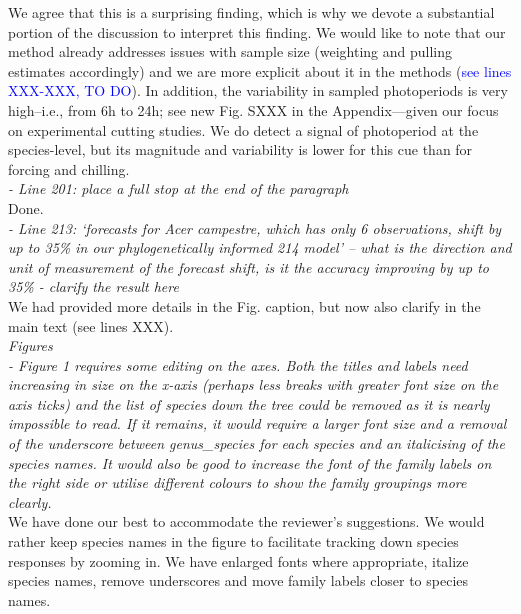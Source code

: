 \documentclass[11pt]{article}
\begin{document}
We agree that this is a surprising finding, which is why we devote a substantial portion of the discussion to interpret this finding. We would like to note that our method already addresses issues with sample size (weighting and pulling estimates accordingly) and we are more explicit about it in the methods (\textcolor{blue}{see lines XXX-XXX, TO DO}). In addition, the variability in sampled photoperiods is very high--i.e., from 6h to 24h; see new Fig. SXXX in the Appendix---given our focus on experimental cutting studies. We do detect a signal of photoperiod at the species-level, but its magnitude and variability is lower for this cue than for forcing and chilling.\\


\emph{- Line 201: place a full stop at the end of the paragraph}\\
Done.\\

\emph{- Line 213: ‘forecasts for Acer campestre, which has only 6 observations, shift by up to 35\% in our phylogenetically informed 214 model’ – what is the direction and unit of measurement of the forecast shift, is it the accuracy improving by up to 35\% - clarify the result here}\\
We had provided more details in the Fig. caption, but now also clarify in the main text (see lines XXX).\\


\emph{Figures}\\
\emph{- Figure 1 requires some editing on the axes. Both the titles and labels need increasing in size on the x-axis (perhaps less breaks with greater font size on the axis ticks) and the list of species down the tree could be removed as it is nearly impossible to read. If it remains, it would require a larger font size and a removal of the underscore between genus\_species for each species and an italicising of the species names. It would also be good to increase the font of the family labels on the right side or utilise different colours to show the family groupings more clearly.}\\
We have done our best to accommodate the reviewer's suggestions. We would rather keep species names in the figure to facilitate tracking down species responses by zooming in. We have enlarged fonts where appropriate, italize species names, remove underscores and move family labels closer to species names.\\
\end{document}
